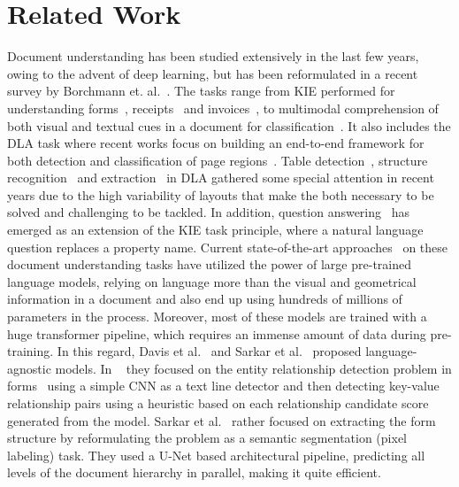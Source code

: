 \documentclass[runningheads]{llncs}
\begin{document}
\section{Related Work}\label{s:sota}
Document understanding has been studied extensively in the last few years, owing to the advent of deep learning, but has been reformulated in a recent survey by Borchmann et. al.~\cite{borchmann2021due}. 
The tasks range from KIE performed for understanding forms~\cite{FUNSD}, receipts~\cite{huang2019icdar2019} and invoices~\cite{goldmann_lutz_2019_3257319}, to multimodal comprehension of both visual and textual cues in a document for classification~\cite{xu2020layoutlmv2,xu2020layoutlm}. It also includes the DLA task where recent works focus on building an end-to-end framework for both detection and classification of page regions~\cite{biswas2021beyond,biswas2022docsegtr}. Table detection~\cite{riba2019table,riba2022table}, structure recognition~\cite{liu2022neural,raja2020table} and extraction~\cite{gemelli-icpr,smock2022pubtables} in DLA gathered some special attention in recent years due to the high variability of layouts that make the both necessary to be solved and challenging to be tackled. In addition, question answering~\cite{mathew2021docvqa,singh2019towards} has emerged as an extension of the KIE task principle, where a natural language question replaces a property name. Current state-of-the-art approaches~\cite{appalaraju2021docformer,hong2020bros,powalski2021going,xu2020layoutlmv2,xu2020layoutlm} on these document understanding tasks have utilized the power of large pre-trained language models, relying on language more than the visual and geometrical information in a document and also end up using hundreds of millions of parameters in the process. Moreover, most of these models are trained with a huge transformer pipeline, which requires an immense amount of data during pre-training. In this regard, Davis et al.~\cite{davis2019deep} and Sarkar et al.~\cite{sarkar2020document} proposed language-agnostic models. In ~\cite{davis2019deep} they focused on the entity relationship detection problem in forms~\cite{FUNSD} using a simple CNN as a text line detector and then detecting key-value relationship pairs using a heuristic based on each relationship candidate score generated from the model. Sarkar et al.~\cite{sarkar2020document} rather focused on extracting the form structure by reformulating the problem as a semantic segmentation (pixel labeling) task. They used a U-Net based architectural pipeline, predicting all levels of the document hierarchy in parallel, making it quite efficient.
\end{document}
